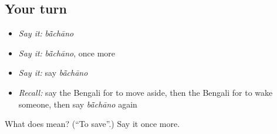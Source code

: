\subsection*{Your turn}
\begin{itemize}
\raggedright
  \item \emph{Say it:} \emph{bā̃chāno}
  \item \emph{Say it:} \emph{bā̃chāno}, once more
  \item \emph{Say it:} say \emph{bā̃chāno}
  \item \emph{Recall:} say the Bengali for to move aside, then the Bengali for to wake someone, then say \emph{bā̃chāno} again
\end{itemize}

\begin{tcolorbox}[breakable,colback=teal!4,colframe=teal!35!black,title={Before you move on}]
What does  mean? (\textquotedblleft{}To save\textquotedblright{}.) Say it once more.
\end{tcolorbox}
